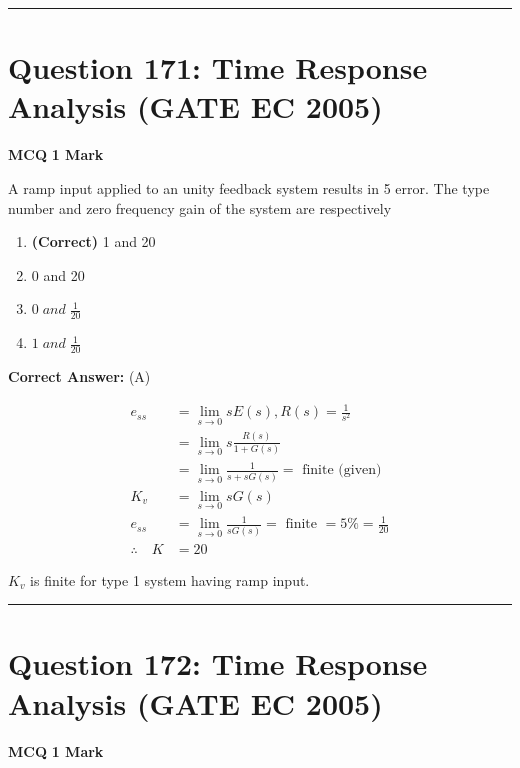 \documentclass[11pt,a4paper]{article}
\begin{document}
\vspace{1.5em}
\hrule
\vspace{1.5em}

\section*{Question 171: Time Response Analysis (GATE EC 2005)}
\noindent \textbf{\color{primary}MCQ} \hfill \textbf{\color{secondary}1 Mark}


\noindent A ramp input applied to an unity feedback system results in 5%
error. The type number and zero frequency gain of the system are respectively


\begin{enumerate}[label=(\Alph*)]
    \item \textbf{(Correct)} 1 and 20
    \item 0 and 20
    \item $0 \; and\; \frac{1}{20}$
    \item $1 \; and \; \frac{1}{20}$
\end{enumerate}

\noindent \textbf{Correct Answer:} (A)

\begin{tcolorbox}[solbox, title=Detailed Solution -- Question 171]
\[
\begin{aligned} e_{s s} &=\lim _{s \rightarrow 0} s E(s), R(s)=\frac{1}{s^{2}} \\ &=\lim _{s \rightarrow 0} s \frac{R(s)}{1+G(s)} \\ &=\lim _{s \rightarrow 0} \frac{1}{s+s G(s)}=\text { finite (given) } \\ K_{v} &=\lim _{s \rightarrow 0} s G(s) \\ e_{s s} &=\lim _{s \rightarrow 0} \frac{1}{s G(s)}=\text { finite }=5 \%=\frac{1}{20} \\ \therefore \quad K &=20 \end{aligned}
\]

$K_{v}$ is finite for type 1 system having ramp input.
\end{tcolorbox}

\vspace{1.5em}
\hrule
\vspace{1.5em}

\section*{Question 172: Time Response Analysis (GATE EC 2005)}
\noindent \textbf{\color{primary}MCQ} \hfill \textbf{\color{secondary}1 Mark}
\end{document}
